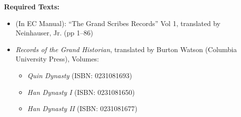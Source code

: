 \documentclass{article}
\begin{document}
\textbf{Required Texts:}
\newcommand{\fallPreceptOneReadingList}{%
	\begin{itemize}
		\item (In EC Manual): “The Grand Scribes Records” Vol 1, translated by Neinhauser, Jr. (pp 1--86)
		\item \textit{Records of the Grand Historian}, translated by Burton Watson (Columbia University Press), Volumes:
		      \begin{itemize}
			      \item \textit{Quin Dynasty} (ISBN: 0231081693)
			      \item \textit{Han Dynasty I} (ISBN: 0231081650)
			      \item \textit{Han Dynasty II} (ISBN: 0231081677)
		      \end{itemize}
	\end{itemize}
}
\fallPreceptOneReadingList%
\end{document}
